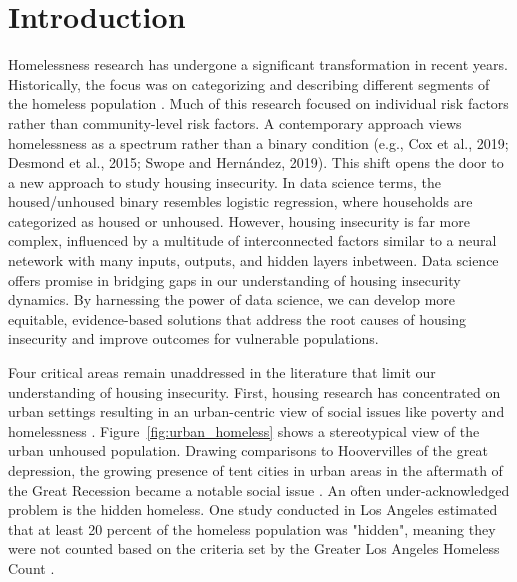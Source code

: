 \chapter{Introduction}  

Homelessness research has undergone a significant transformation in recent years. Historically, the focus was on categorizing and describing different segments of the homeless population \citep{lee_homelessness_2021}. Much of this research focused on individual risk factors rather than community-level risk factors. A contemporary approach views homelessness as a spectrum rather than a binary condition (e.g., Cox et al., 2019; Desmond et al., 2015; Swope and Hernández, 2019). This shift opens the door to a new approach to study housing insecurity. In data science terms, the housed/unhoused binary resembles logistic regression, where households are categorized as housed or unhoused. However, housing insecurity is far more complex, influenced by a multitude of interconnected factors similar to a neural netework with many inputs, outputs, and hidden layers inbetween. Data science offers promise in bridging gaps in our understanding of housing insecurity dynamics. By harnessing the power of data science, we can develop more equitable, evidence-based solutions that address the root causes of housing insecurity and improve outcomes for vulnerable populations.

Four critical areas remain unaddressed in the literature that limit our understanding of housing insecurity. First, housing research has concentrated on urban settings resulting in an urban-centric view of social issues like poverty and homelessness \citep{gleason_using_2021}. Figure~\ref{fig:urban_homeless}  shows a stereotypical view of the urban unhoused population. Drawing comparisons to Hoovervilles of the great depression, the growing presence of tent cities in urban areas in the aftermath of the Great Recession became a notable social issue \citep{herring_roots_2015}. An often under-acknowledged problem is the hidden homeless. One study conducted in Los Angeles estimated that at least 20 percent of the homeless population was "hidden", meaning they were not counted based on the criteria set by the Greater Los Angeles Homeless Count \citep{agans_enumerating_2014}.  \textcolor{white}{\citep{molina_notitle_2023}} %

